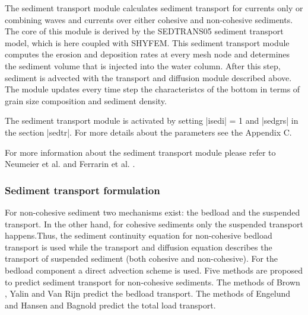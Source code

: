
%
%
%
%
%
%
%

The sediment transport module calculates sediment transport for currents 
only or combining waves and currents over either cohesive and non-cohesive
sediments. The core of this module is derived by the SEDTRANS05 
sediment transport model, which is here coupled with SHYFEM. This sediment 
transport module computes the erosion and deposition rates at every mesh 
node and determines the sediment volume that is injected into the water 
column. After this step, sediment is advected with the transport and 
diffusion module described above. The module updates every time step the 
characteristcs of the bottom in terms of grain size composition and 
sediment density.

The sediment transport module is activated by setting |isedi| = 1 
and |sedgrs| in the section |sedtr|. 
For more details about the parameters see the Appendix C.

For more information about the sediment transport module please refer 
to Neumeier et al. \cite{urs:sedtrans05} and Ferrarin et al. 
\cite{ferrarin:morpho08}.

\subsubsection{Sediment transport formulation}
For non-cohesive sediment two mechanisms exist: the bedload and the 
suspended transport. In the other hand, for cohesive sediments only 
the suspended transport happens.Thus, the sediment continuity equation 
for non-cohesive bedload transport is used while the transport and diffusion 
equation describes the transport of suspended sediment 
(both cohesive and non-cohesive).
For the bedload component a direct advection scheme is used. 
Five methods are proposed to predict sediment transport for non-cohesive
sediments. The methods of Brown \cite{brown:engi}, Yalin \cite{yalin:bedload} 
and Van Rijn \cite{vanrijn93:prin} predict the bedload transport. The 
methods of Engelund and Hansen \cite{eh:momo} and Bagnold 
\cite{bagnolds:ma-sed} predict the total load transport.

